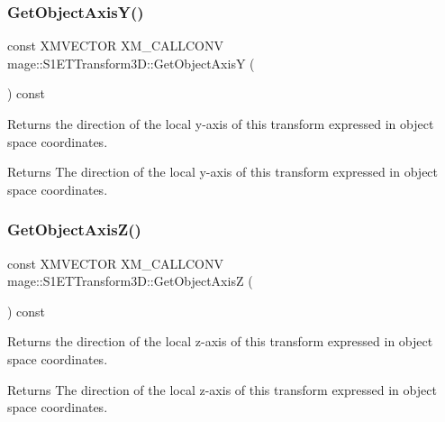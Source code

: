 \subsubsection{\texorpdfstring{Get\+Object\+Axis\+Y()}{GetObjectAxisY()}}
{\footnotesize\ttfamily const X\+M\+V\+E\+C\+T\+OR X\+M\+\_\+\+C\+A\+L\+L\+C\+O\+NV mage\+::\+S1\+E\+T\+Transform3\+D\+::\+Get\+Object\+AxisY (\begin{DoxyParamCaption}{ }\end{DoxyParamCaption}) const\hspace{0.3cm}{\ttfamily [noexcept]}}

Returns the direction of the local y-\/axis of this transform expressed in object space coordinates.

\begin{DoxyReturn}{Returns}
The direction of the local y-\/axis of this transform expressed in object space coordinates. 
\end{DoxyReturn}
\mbox{\label{classmage_1_1_s1_e_t_transform3_d_ac4e2a9392d2d3b6b5dd4364be9df0cda}} 
\subsubsection{\texorpdfstring{Get\+Object\+Axis\+Z()}{GetObjectAxisZ()}}
{\footnotesize\ttfamily const X\+M\+V\+E\+C\+T\+OR X\+M\+\_\+\+C\+A\+L\+L\+C\+O\+NV mage\+::\+S1\+E\+T\+Transform3\+D\+::\+Get\+Object\+AxisZ (\begin{DoxyParamCaption}{ }\end{DoxyParamCaption}) const\hspace{0.3cm}{\ttfamily [noexcept]}}

Returns the direction of the local z-\/axis of this transform expressed in object space coordinates.

\begin{DoxyReturn}{Returns}
The direction of the local z-\/axis of this transform expressed in object space coordinates. 
\end{DoxyReturn}
\mbox{\label{classmage_1_1_s1_e_t_transform3_d_ab19a865b63749d63a1a7028664ead61d}} 
